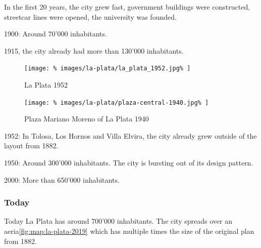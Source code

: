 \documentclass[twocolumn]{article}
\begin{document}
			In the first 20 years, the city grew fast, government buildings were constructed, streetcar lines were opened, the university was founded.
			
			1900: Around 70'000 inhabitants.
			
			1915, the city already had more than 130'000 inhabitants.
			
			
			
			
			
			\begin{figure}[H]
				\texttt{[image: \%
					images/la-plata/la\_plata\_1952.jpg\%
				]}
				\caption{La Plata 1952\cite{MOSP:InvestigacionHistorica}}
				\label{fig:map:la-plata-1952}
			\end{figure}
			
			\begin{figure}[H]
				\texttt{[image: \%
					images/la-plata/plaza-central-1940.jpg\%
				]}
				\caption{Plaza Mariano Moreno of La Plata 1940\cite{Blogspot:Arqruotolo:la-plata-o-la-geometria-hecha-espacio}}
				\label{fig:img:la-plata-1940}
			\end{figure}
			1952: In Tolosa, Los Hornos and Villa Elvira, the city already grew outside of the layout from 1882.
			
			1950: Around 300'000 inhabitants.
			The city is bursting out of its design pattern. 
			
			
			
			
			2000: More than 650'000 inhabitants.
		
			
			
			\subsubsection{Today}
			
			Today La Plata has around 700'000 inhabitants. The city spreads over an aeria\ref{fig:map:la-plata-2019} which has multiple times the size of the original plan from 1882.			
			
\end{document}
